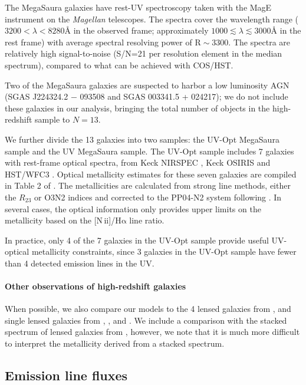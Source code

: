 \documentclass[preprint2]{aastex62}
\newcommand{\nii}{[N\,{\sc ii}]\xspace}
\newcommand{\ha}{\ensuremath{\mathrm{H\alpha}}\xspace}
\newcommand{\ang}{\ensuremath{\mbox{\AA}}\xspace}
\newcommand{\mage}{{\sc Meg}a{\sc S}a{\sc ura}\xspace}
\begin{document}
The \mage galaxies have rest-UV spectroscopy taken with the MagE instrument on the \emph{Magellan} telescopes.
The spectra cover the wavelength range ($3200 < \lambda < 8280$\ang in the observed frame; approximately $1000 \lesssim \lambda \lesssim 3000$\ang in the rest frame) with average spectral resolving power of $\mathrm{R}\sim3300$. The spectra are relatively high signal-to-noise (S/N=21 per resolution element in the median spectrum), compared to what can be achieved with COS/HST.

Two of the \mage galaxies are suspected to harbor a low luminosity AGN (SGAS J224324.2 − 093508 and SGAS 003341.5 + 024217); we do not include these galaxies in our analysis, bringing the total number of objects in the high-redshift sample to $N=13$.

We further divide the 13 galaxies into two samples: the UV-Opt \mage sample and the UV \mage sample. The UV-Opt sample includes 7 galaxies with rest-frame optical spectra, from Keck NIRSPEC \citep{Rigby+2011}, Keck OSIRIS \citep{Wuyts+2014} and HST/WFC3 \citep{Whitaker+2014}. Optical metallicity estimates for these seven galaxies are compiled in Table 2 of \citet{Rigby+2018b}. The metallicities are calculated from strong line methods, either the $R_{23}$ or O3N2 indices \citep{Pettini+2004} and corrected to the PP04-N2 system following \citet{Kewley+2008}. In several cases, the optical information only provides upper limits on the metallicity based on the \nii/\ha line ratio.

In practice, only 4 of the 7 galaxies in the UV-Opt sample provide useful UV-optical metallicity constraints, since 3 galaxies in the UV-Opt sample have fewer than 4 detected emission lines in the UV.

\paragraph{Other observations of high-redshift galaxies} When possible, we also compare our models to the 4 lensed galaxies from \citet{Stark+2014}, and single lensed galaxies from \citet{Erb+2010}, \citet{Christensen+2012}, and \citet{Berg+2018}. We include a comparison with the stacked spectrum of lensed galaxies from \citet{Steidel+2016}, however, we note that it is much more difficult to interpret the metallicity derived from a stacked spectrum.
\subsection{Emission line fluxes}\label{sec:data:lines}
\end{document}
